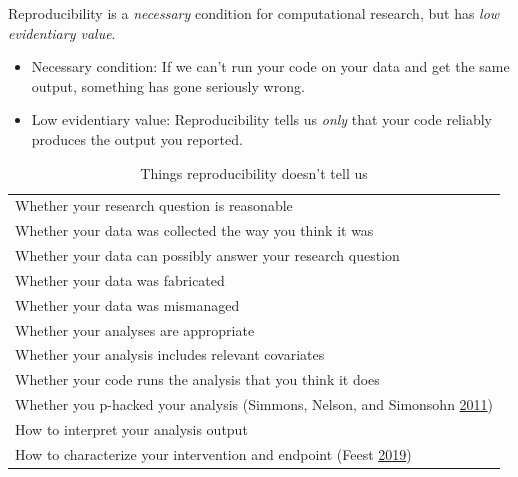 \documentclass[
]{article}
\begin{document}
Reproducibility is a \emph{necessary} condition for computational research, but has \emph{low evidentiary value}.

\begin{itemize}
\item
  Necessary condition: If we can't run your code on your data and get the same output, something has gone seriously wrong.
\item
  Low evidentiary value: Reproducibility tells us \emph{only} that your code reliably produces the output you reported.
\end{itemize}

\begin{longtable}[]{@{}l@{}}
\caption{Things reproducibility doesn't tell us}\tabularnewline
\toprule
\endhead
\begin{minipage}[t]{0.97\columnwidth}\raggedright
Whether your research question is reasonable\strut
\end{minipage}\tabularnewline
\begin{minipage}[t]{0.97\columnwidth}\raggedright
Whether your data was collected the way you think it was\strut
\end{minipage}\tabularnewline
\begin{minipage}[t]{0.97\columnwidth}\raggedright
Whether your data can possibly answer your research question\strut
\end{minipage}\tabularnewline
\begin{minipage}[t]{0.97\columnwidth}\raggedright
Whether your data was fabricated\strut
\end{minipage}\tabularnewline
\begin{minipage}[t]{0.97\columnwidth}\raggedright
Whether your data was mismanaged\strut
\end{minipage}\tabularnewline
\begin{minipage}[t]{0.97\columnwidth}\raggedright
Whether your analyses are appropriate\strut
\end{minipage}\tabularnewline
\begin{minipage}[t]{0.97\columnwidth}\raggedright
Whether your analysis includes relevant covariates\strut
\end{minipage}\tabularnewline
\begin{minipage}[t]{0.97\columnwidth}\raggedright
Whether your code runs the analysis that you think it does\strut
\end{minipage}\tabularnewline
\begin{minipage}[t]{0.97\columnwidth}\raggedright
Whether you p-hacked your analysis (Simmons, Nelson, and Simonsohn \protect\hyperlink{ref-SimmonsFalsePositivePsychology2011}{2011})\strut
\end{minipage}\tabularnewline
\begin{minipage}[t]{0.97\columnwidth}\raggedright
How to interpret your analysis output\strut
\end{minipage}\tabularnewline
\begin{minipage}[t]{0.97\columnwidth}\raggedright
How to characterize your intervention and endpoint (Feest \protect\hyperlink{ref-FeestWhyReplicationOverrated2019}{2019})\strut
\end{minipage}\tabularnewline
\bottomrule
\end{longtable}
\end{document}
